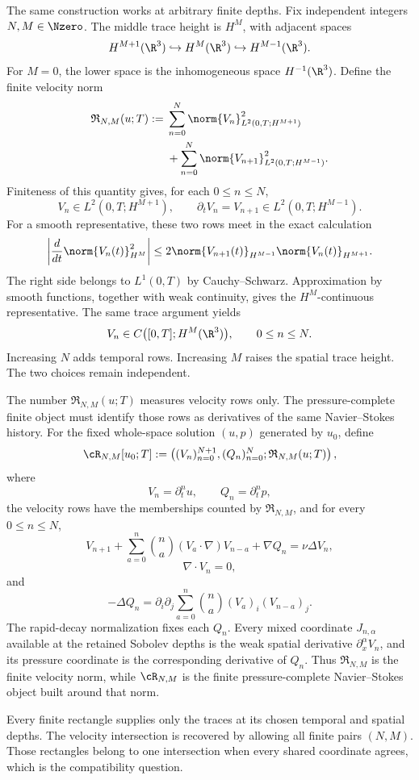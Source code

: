 The same construction works at arbitrary finite depths.
Fix independent integers \(N,M\in\Nzero\).
The middle trace height is \(H^M\), with adjacent spaces
\[
  H^{M+1}(\R^3)
  \hookrightarrow
  H^M(\R^3)
  \hookrightarrow
  H^{M-1}(\R^3).
\]
For \(M=0\), the lower space is the inhomogeneous space \(H^{-1}(\R^3)\).
Define the finite velocity norm
\begin{align*}
  \mathfrak R_{N,M}(u;T)
  :={}&
  \sum_{n=0}^{N}
  \norm{V_n}_{L^2(0,T;H^{M+1})}^{2}
  \\
  &+
  \sum_{n=0}^{N}
  \norm{V_{n+1}}_{L^2(0,T;H^{M-1})}^{2}.
\end{align*}
Finiteness of this quantity gives, for each \(0\leq n\leq N\),
\[
  V_n\in L^2(0,T;H^{M+1}),
  \qquad
  \partial_tV_n=V_{n+1}\in L^2(0,T;H^{M-1}).
\]
For a smooth representative, these two rows meet in the exact calculation
\[
  \left|
    \frac{d}{dt}
    \norm{V_n(t)}_{H^M}^{2}
  \right|
  \leq
  2
  \norm{V_{n+1}(t)}_{H^{M-1}}
  \norm{V_n(t)}_{H^{M+1}}.
\]
The right side belongs to \(L^1(0,T)\) by Cauchy--Schwarz.
Approximation by smooth functions, together with weak continuity, gives the \(H^M\)-continuous representative.
The same trace argument yields
\[
  V_n
  \in
  C\bigl([0,T];H^M(\R^3)\bigr),
  \qquad
  0\leq n\leq N.
\]
Increasing \(N\) adds temporal rows.
Increasing \(M\) raises the spatial trace height.
The two choices remain independent.

The number \(\mathfrak R_{N,M}(u;T)\) measures velocity rows only.
The pressure-complete finite object must identify those rows as derivatives of the same Navier--Stokes history.
For the fixed whole-space solution \((u,p)\) generated by \(u_0\), define
\[
  \cR_{N,M}[u_0;T]
  :=
  \left(
    (V_n)_{n=0}^{N+1},
    (Q_n)_{n=0}^{N};
    \mathfrak R_{N,M}(u;T)
  \right),
\]
where
\[
  V_n=\partial_t^nu,
  \qquad
  Q_n=\partial_t^np,
\]
the velocity rows have the memberships counted by \(\mathfrak R_{N,M}\), and for every \(0\leq n\leq N\),
\[
  V_{n+1}
  +
  \sum_{a=0}^{n}
  \binom{n}{a}
  (V_a\cdot\nabla)V_{n-a}
  +\nabla Q_n
  =
  \nu\Delta V_n,
\]
\[
  \nabla\cdot V_n=0,
\]
and
\[
  -\Delta Q_n
  =
  \partial_i\partial_j
  \sum_{a=0}^{n}
  \binom{n}{a}
  (V_a)_i(V_{n-a})_j.
\]
The rapid-decay normalization fixes each \(Q_n\).
Every mixed coordinate \(J_{n,\alpha}\) available at the retained Sobolev depths is the weak spatial derivative \(\partial_x^\alpha V_n\), and its pressure coordinate is the corresponding derivative of \(Q_n\).
Thus \(\mathfrak R_{N,M}\) is the finite velocity norm, while \(\cR_{N,M}\) is the finite pressure-complete Navier--Stokes object built around that norm.

Every finite rectangle supplies only the traces at its chosen temporal and spatial depths.
The velocity intersection is recovered by allowing all finite pairs \((N,M)\).
Those rectangles belong to one intersection when every shared coordinate agrees, which is the compatibility question.
